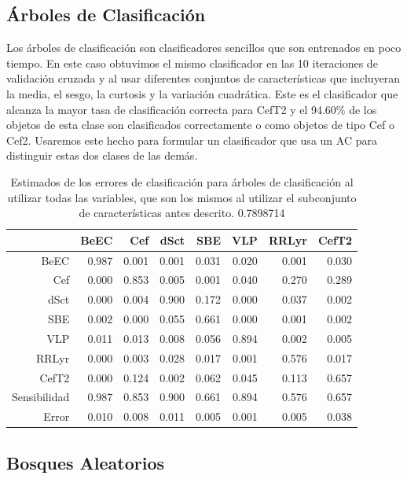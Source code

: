 \documentclass[letterpaper,12pt]{book}
\begin{document}
\subsection{Árboles de Clasificación}

Los árboles de clasificación son clasificadores sencillos que son entrenados en poco tiempo. En este caso obtuvimos el mismo clasificador en las 10 iteraciones de validación cruzada y al usar diferentes conjuntos de características que incluyeran la media, el sesgo, la curtosis y la variación cuadrática.  Este es el clasificador que alcanza la mayor tasa de clasificación correcta para CefT2 y el 94.60\% de los objetos de esta clase son clasificados correctamente o como objetos de tipo Cef o Cef2. Usaremos este hecho para formular un clasificador que usa un AC para distinguir estas dos clases de las demás.

\begin{table}[ht]
  \centering
  \begin{tabular}{rrrrrrrr}
    \hline
    \hline
    & BeEC & Cef & dSct & SBE & VLP & RRLyr & CefT2 \\ 
    \hline
    \hline
    BeEC & 0.987 & 0.001 & 0.001 & 0.031 & 0.020 & 0.001 & 0.030 \\ 
    Cef & 0.000 & 0.853 & 0.005 & 0.001 & 0.040 & 0.270 & 0.289 \\ 
    dSct & 0.000 & 0.004 & 0.900 & 0.172 & 0.000 & 0.037 & 0.002 \\ 
    SBE & 0.002 & 0.000 & 0.055 & 0.661 & 0.000 & 0.001 & 0.002 \\ 
    VLP & 0.011 & 0.013 & 0.008 & 0.056 & 0.894 & 0.002 & 0.005 \\ 
    RRLyr & 0.000 & 0.003 & 0.028 & 0.017 & 0.001 & 0.576 & 0.017 \\ 
    CefT2 & 0.000 & 0.124 & 0.002 & 0.062 & 0.045 & 0.113 & 0.657 \\ 
    \hline
    \hline
    Sensibilidad & 0.987 & 0.853 & 0.900 & 0.661 & 0.894 & 0.576 & 0.657 \\
    \hline
    Error & 0.010 & 0.008 & 0.011 & 0.005 & 0.001 & 0.005 & 0.038 \\ 
    \hline
    \hline
  \end{tabular}
  \caption{Estimados de los errores de clasificación para árboles de clasificación al utilizar todas las variables, que son los mismos al utilizar el subconjunto de características antes descrito. 0.7898714 }
\end{table}

\subsection{Bosques Aleatorios}
\end{document}
